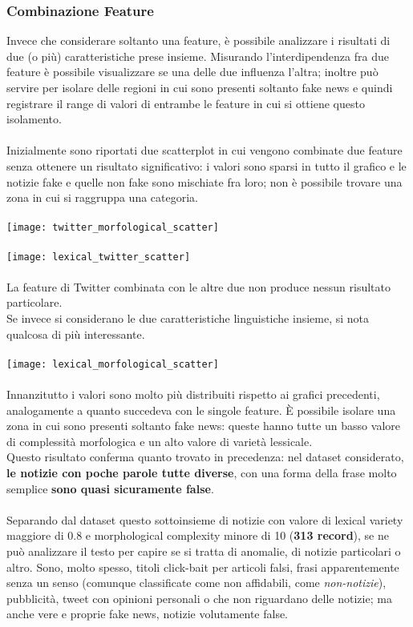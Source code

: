 \documentclass{article}
\begin{document}
\begin{multicols}{2}
				\subsubsection{Combinazione Feature}
				Invece che considerare soltanto una feature, è possibile analizzare i risultati di due (o più) caratteristiche prese insieme. Misurando l'interdipendenza fra due feature è possibile visualizzare se una delle due influenza l'altra; inoltre può servire per isolare delle regioni in cui sono presenti soltanto fake news e quindi registrare il range di valori di entrambe le feature in cui si ottiene questo isolamento.\\~\\
				Inizialmente sono riportati due scatterplot in cui vengono combinate due feature senza ottenere un risultato significativo: i valori sono sparsi in tutto il grafico e le notizie fake e quelle non fake sono mischiate fra loro; non è possibile trovare una zona in cui si raggruppa una categoria.
				\\~\\						
				\texttt{[image: twitter\_morfological\_scatter]}
				\\~\\
				\texttt{[image: lexical\_twitter\_scatter]}
				\\~\\
				La feature di Twitter combinata con le altre due non produce nessun risultato particolare.\\Se invece si considerano le due caratteristiche linguistiche insieme, si nota qualcosa di più interessante.
				\\~\\
				\texttt{[image: lexical\_morfological\_scatter]}
				\\~\\
				Innanzitutto i valori sono molto più distribuiti rispetto ai grafici precedenti, analogamente a quanto succedeva con le singole feature. È possibile isolare una zona in cui sono presenti soltanto fake news: queste hanno tutte un basso valore di complessità morfologica e un alto valore di varietà lessicale.\\
				Questo risultato conferma quanto trovato in precedenza: nel dataset considerato, \textbf{le notizie con poche parole tutte diverse}, con una forma della frase molto semplice \textbf{sono quasi sicuramente false}.\\~\\
				Separando dal dataset questo sottoinsieme di notizie con valore di lexical variety maggiore di 0.8 e morphological complexity minore di 10 (\textbf{313 record}), se ne può analizzare il testo per capire se si tratta di anomalie, di notizie particolari o altro. Sono, molto spesso, titoli click-bait per articoli falsi, frasi apparentemente senza un senso (comunque classificate come non affidabili, come \textit{non-notizie}), pubblicità, tweet con opinioni personali o che non riguardano delle notizie; ma anche vere e proprie fake news, notizie volutamente false.


\end{multicols}
\end{document}
